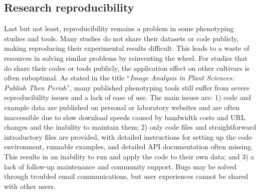 \subsection{Research reproducibility}
Last but not least, reproducibility remains a problem in some phenotyping studies and tools. Many studies do not share their datasets or code publicly, making reproducing their experimental results difficult. This leads to a waste of resources in solving similar problems by reinventing the wheel. For studies that do share their codes or tools publicly, the application effect on other cultivars is often suboptimal. As \citet{lobet_image_2017} stated in the title ``\textit{Image Analysis in Plant Sciences: Publish Then Perish}'', many published phenotyping tools still suffer from severe reproducibility issues and a lack of ease of use. The main issues are: 1) code and example data are published on personal or laboratory websites and are often inaccessible due to slow download speeds caused by bandwidth costs and URL changes and the inability to maintain them; 2) only code files and straightforward introductory files are provided, with detailed instructions for setting up the code environment, runnable examples, and detailed API documentation often missing. This results in an inability to run and apply the code to their own data; and 3) a lack of follow-up maintenance and community support. Bugs may be solved through troubled email communications, but user experiences cannot be shared with other users.



